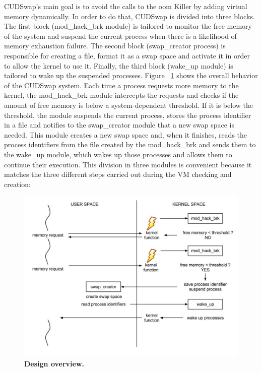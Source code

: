 CUDSwap’s main goal is to avoid the calls to the \gls{oom} Killer by adding virtual
memory dynamically. In order to do that, CUDSwap is divided into three blocks. The
first block (mod\_hack\_brk module) is tailored to monitor the free memory of the
system and suspend the current process when there is a likelihood of memory exhaustion
failure. The second block (swap\_creator process) is responsible for creating a file,
format it as a swap space and activate it in order to allow the kernel to use it. Finally,
the third block (wake\_up module) is tailored to wake up the suspended processes.
Figure ~\ref{mefigure1} shows the overall behavior of the CUDSwap system. Each time
a process requests more memory to the kernel, the mod\_hack\_brk module intercepts the
requests and checks if the amount of free memory is below a system-dependent threshold.
If it is below the threshold, the module suspends the current process, stores the process
identifier in a file and notifies to the swap\_creator module that a new swap space is needed.
This module creates a new swap space and, when it finishes, reads the process identifiers
from the file created by the mod\_hack\_brk and sends them to the wake\_up module,
which wakes up those processes and allows them to continue their execution. This division
in three modules is convenient because it matches the three different steps carried out during
the VM checking and creation:

\begin{figure}[htbp]
\includegraphics[width=\columnwidth]{chapter_memory_exhaustion_figures/Figure_1.png}
\caption[Design overview]{\textbf{Design overview.}}
\label{mefigure1}
\end{figure}

